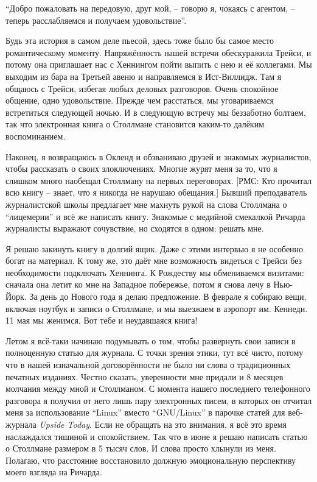 ``Добро пожаловать на передовую, друг мой, -- говорю я, чокаясь с агентом, -- теперь расслабляемся и получаем удовольствие''.

Будь эта история в самом деле пьесой, здесь тоже было бы самое место романтическому моменту. Напряжённость нашей встречи обескуражила Трейси, и потому она приглашает нас с Хеннингом пойти выпить с нею и её коллегами. Мы выходим из бара на Третьей авеню и направляемся в Ист-Виллидж. Там я общаюсь с Трейси, избегая любых деловых разговоров. Очень спокойное общение, одно удовольствие. Прежде чем расстаться, мы уговариваемся встретиться следующей ночью. И в следующую встречу мы беззаботно болтаем, так что электронная книга о Столлмане становится каким-то далёким воспоминанием.

Наконец, я возвращаюсь в Окленд и обзваниваю друзей и знакомых журналистов, чтобы рассказать о своих злоключениях. Многие журят меня за то, что я слишком много наобещал Столлману на первых переговорах. [РМС: Кто прочитал всю книгу -- знает, что я никогда не нарушаю обещания.] Бывший преподаватель журналистской школы предлагает мне махнуть рукой на слова Столлмана о ``лицемерии'' и всё же написать книгу. Знакомые с медийной смекалкой Ричарда журналисты выражают сочувствие, но сходятся в одном: решать мне.

Я решаю закинуть книгу в долгий ящик. Даже с этими интервью я не особенно богат на материал. К тому же, это даёт мне возможность видеться с Трейси без необходимости подключать Хеннинга. К Рождеству мы обмениваемся визитами: сначала она летит ко мне на Западное побережье, потом я снова лечу в Нью-Йорк. За день до Нового года я делаю предложение. В феврале я собираю вещи, включая ноутбук и записи о Столлмане, и мы выезжаем в аэропорт им. Кеннеди. 11 мая мы женимся. Вот тебе и неудавшаяся книга!

Летом я всё-таки начинаю подумывать о том, чтобы развернуть свои записи в полноценную статью для журнала. С точки зрения этики, тут всё чисто, потому что в нашей изначальной договорённости не было ни слова о традиционных печатных изданиях. Честно сказать, уверенности мне придали и 8 месяцев молчания между мной и Столлманом. С момента нашего последнего телефонного разговора я получил от него лишь пару электронных писем, в которых он отчитал меня за использование ``Linux'' вместо ``GNU/Linux'' в парочке статей для веб-журнала \textit{Upside Today}. Если не обращать на это внимания, я всё это время наслаждался тишиной и спокойствием. Так что в июне я решаю написать статью о Столлмане размером в 5 тысяч слов. И слова просто хлынули из меня. Полагаю, что расстояние восстановило должную эмоциональную перспективу моего взгляда на Ричарда.


